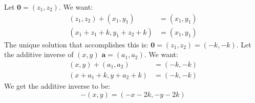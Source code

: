 \begin{sol}
Let $\bm{0} = (z_1,z_2)$. We want:
    \begin{align}
        (z_1,z_2) + (x_1,y_1) &= (x_1,y_1) \\ 
        (x_1+z_1+k, y_1+z_2+k) &= (x_1,y_1)
    \end{align}
    The unique solution that accomplishes this is: $\bm{0} = (z_1,z_2) = (-k,-k)$.
 Let the additive inverse of $(x,y)$ $\bm{a}=(a_1,a_2)$. We want:
    \begin{align}
        (x,y) + (a_1,a_2) &= (-k,-k) \\ 
        (x+a_1+k,y+a_2+k) &= (-k,-k)
    \end{align}
    We get the additive inverse to be:
    \begin{equation}
       -(x,y) = (-x-2k,-y-2k)
    \end{equation}
\end{sol}